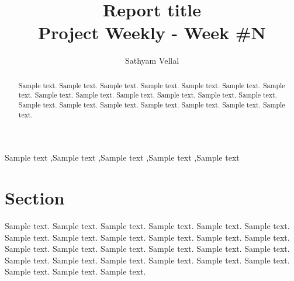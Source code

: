 \documentclass[preprint,12pt,3p]{elsarticle}
\begin{document}
\begin{frontmatter}

\title{Report title \\ {\small Project Weekly - Week \#N}}

\author[author1]{Sathyam Vellal}
\address{Los Angeles, CA 90007, USA}


\begin{abstract}
Sample text. Sample text. Sample text. Sample text. Sample text. Sample text. Sample text. Sample text. Sample text. Sample text. Sample text. Sample text. Sample text. Sample text. Sample text. Sample text. Sample text. Sample text. Sample text. Sample text.
\end{abstract}

\begin{keyword}
Sample text \sep Sample text \sep Sample text \sep Sample text \sep Sample text
\end{keyword}

\end{frontmatter}

\section{Section}
\label{sec-section}

Sample text. Sample text. Sample text. Sample text. Sample text. Sample text. Sample text. Sample text. Sample text. Sample text. Sample text. Sample text. Sample text. Sample text. Sample text. Sample text. Sample text. Sample text. Sample text. Sample text. Sample text. Sample text. Sample text. Sample text. Sample text. Sample text. Sample text.






\end{document}

